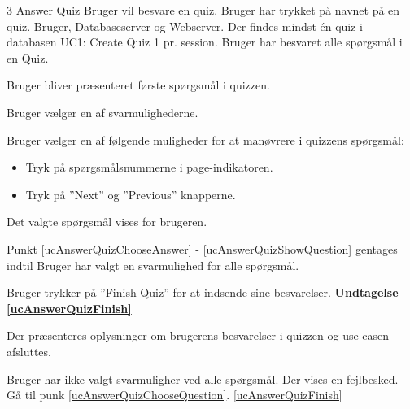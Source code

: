 \uchead
	{3}
	{Answer Quiz}
	{Bruger vil besvare en quiz.}
	{Bruger har trykket på navnet på en quiz.}
	{Bruger, Databaseserver og Webserver.}
	{Der findes mindst én quiz i databasen} %
	{UC1: Create Quiz}
	{1 pr. session.}
	{Bruger har besvaret alle spørgsmål i en Quiz.}

\item Bruger bliver præsenteret første spørgsmål i quizzen.

\item \label{ucAnswerQuizChooseAnswer} Bruger vælger en af svarmulighederne.
\item \label{ucAnswerQuizChooseQuestion} Bruger vælger en af følgende muligheder for at manøvrere i quizzens spørgsmål:
\begin{itemize}
	\item Tryk på spørgsmålsnummerne i page-indikatoren.
	\item Tryk på ''Next'' og ''Previous'' knapperne.
\end{itemize}
\item \label{ucAnswerQuizShowQuestion} Det valgte spørgsmål vises for brugeren.
\item Punkt \ref{ucAnswerQuizChooseAnswer} - \ref{ucAnswerQuizShowQuestion} gentages indtil Bruger har valgt en svarmulighed for alle spørgsmål.
\item \label{ucAnswerQuizFinish} Bruger trykker på ''Finish Quiz'' for at indsende sine besvarelser. \textbf{Undtagelse \ref{ucAnswerQuizFinish}}
\item Der præsenteres oplysninger om brugerens besvarelser i quizzen og use casen afsluttes.

\ucdescriptionend

\ucextension
	{Bruger har ikke valgt svarmuligher ved alle spørgsmål.}
	{Der vises en fejlbesked. Gå til punk \ref{ucAnswerQuizChooseQuestion}.}
	{\ref{ucAnswerQuizFinish}}

